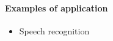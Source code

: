 \paragraph{Examples of application}
\begin{itemize}
    \item Speech recognition
\end{itemize}

\subsection{}

